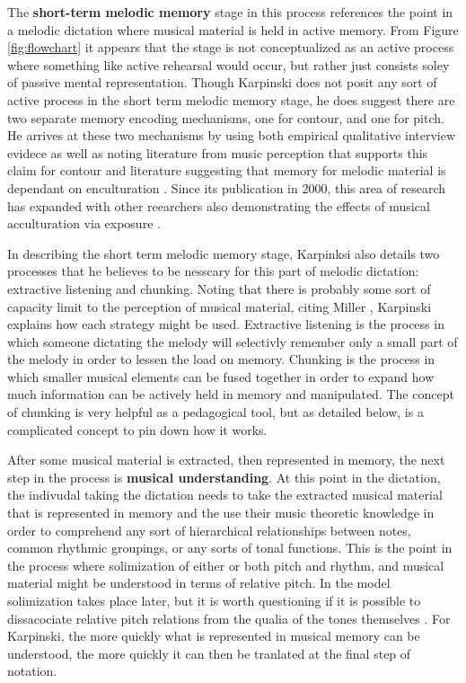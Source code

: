 \documentclass[]{book}
\begin{document}
The \textbf{short-term melodic memory} stage in this process references the point in a melodic dictation where musical material is held in active memory.
From Figure \ref{fig:flowchart} it appears that the stage is not conceptualized as an active process where something like active rehearsal would occur, but rather just consists soley of passive mental representation.
Though Karpinski does not posit any sort of active process in the short term melodic memory stage, he does suggest there are two separate memory encoding mechanisms, one for contour, and one for pitch.
He arrives at these two mechanisms by using both empirical qualitative interview evidece as well as noting literature from music perception that supports this claim for contour \citep{dowlingScaleContourTwo1978, dewittRecognitionNovelMelodies1986} and literature suggesting that memory for melodic material is dependant on enculturation \citep{ouraMemoryMelodiesSubjects1988, handelListeningIntroductionPerception1989, dowlingExpectancyAttentionMelody1990}.
Since its publication in 2000, this area of research has expanded with other reearchers also demonstrating the effects of musical acculturation via exposure \citep{eerolaExpectancySamiYoiks2009, stevensMusicPerceptionCognition2012, pearceAuditoryExpectationInformation2012}.

In describing the short term melodic memory stage, Karpinksi also details two processes that he believes to be nesscary for this part of melodic dictation: extractive listening and chunking.
Noting that there is probably some sort of capacity limit to the perception of musical material, citing Miller \citeyearpar{millerMagicalNumberSeven1956}, Karpinski explains how each strategy might be used.
Extractive listening is the process in which someone dictating the melody will selectivly remember only a small part of the melody in order to lessen the load on memory.
Chunking is the process in which smaller musical elements can be fused together in order to expand how much information can be actively held in memory and manipulated.
The concept of chunking is very helpful as a pedagogical tool, but as detailed below, is a complicated concept to pin down how it works.

After some musical material is extracted, then represented in memory, the next step in the process is \textbf{musical understanding}.
At this point in the dictation, the indivudal taking the dictation needs to take the extracted musical material that is represented in memory and the use their music theoretic knowledge in order to comprehend any sort of hierarchical relationships between notes, common rhythmic groupings, or any sorts of tonal functions.
This is the point in the process where solimization of either or both pitch and rhythm, and musical material might be understood in terms of relative pitch.
In the model solimization takes place later, but it is worth questioning if it is possible to dissacociate relative pitch relations from the qualia of the tones themselves \citep{arthurPerceptualStudyScaledegree2018}.
For Karpinski, the more quickly what is represented in musical memory can be understood, the more quickly it can then be tranlated at the final step of notation.
\end{document}
